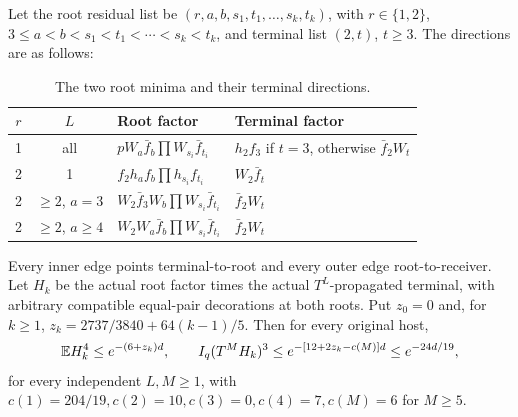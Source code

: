 \begin{theorem}
\label{thm:odd-two:roots}
Let the root residual list be
\((r,a,b,s_1,t_1,\ldots,s_k,t_k)\), with \(r\in\{1,2\}\),
\(3\le a<b<s_1<t_1<\cdots<s_k<t_k\), and terminal list
\((2,t)\), \(t\ge3\). The directions are as follows:
\begin{longtable}{@{}ccp{.40\linewidth}p{.32\linewidth}@{}}
\caption{The two root minima and their terminal directions.}
\label{tab:odd-two:directions}\\
\toprule
\(r\)&\(L\)&Root factor&Terminal factor\\
\midrule
1&all&\(pW_a\bar f_b\prod W_{s_i}\bar f_{t_i}\)
 &\(h_2f_3\) if \(t=3\), otherwise \(\bar f_2W_t\)\\
2&1&\(f_2h_af_b\prod h_{s_i}f_{t_i}\)&\(W_2\bar f_t\)\\
2&\(\ge2\), \(a=3\)&\(W_2\bar f_3W_b\prod W_{s_i}\bar f_{t_i}\)
 &\(\bar f_2W_t\)\\
2&\(\ge2\), \(a\ge4\)&\(W_2W_a\bar f_b\prod W_{s_i}\bar f_{t_i}\)
 &\(\bar f_2W_t\)\\
\bottomrule
\end{longtable}
Every inner edge points terminal-to-root and every outer edge
root-to-receiver. Let \(H_k\) be the actual root factor times the
actual \(T^L\)-propagated terminal, with arbitrary compatible equal-pair
decorations at both roots. Put \(z_0=0\) and, for \(k\ge1\),
\(z_k=2737/3840+64(k-1)/5\). Then for every original host,
\begin{equation}\label{eq:odd-two:conclusion}
 \mathbb E H_k^4\le e^{-(6+z_k)d},\qquad
 I_q(T^MH_k)^3\le e^{-[12+2z_k-c(M)]d}\le e^{-24d/19},
\end{equation}
for every independent \(L,M\ge1\), with
\(c(1)=204/19,c(2)=10,c(3)=0,c(4)=7,c(M)=6\) for \(M\ge5\).
\end{theorem}
